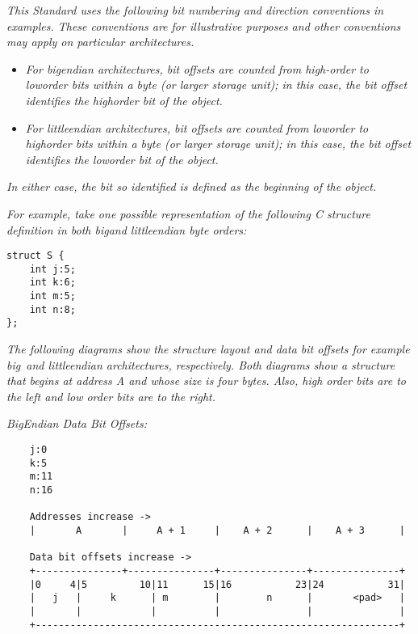 \textit{This Standard uses the following bit numbering and direction
conventions in examples. These conventions are for illustrative
purposes and other conventions may apply on particular
architectures.}


\begin{itemize}
\item \textit{For big\dash endian architectures, bit offsets are
counted from high-order to low\dash order bits within a byte (or
larger storage unit); in this case, the bit offset identifies
the high\dash order bit of the object.}

\item \textit{For little\dash endian architectures, bit offsets are
counted from low\dash order to high\dash order bits within a byte (or
larger storage unit); in this case, the bit offset identifies
the low\dash order bit of the object.}
\end{itemize}


\textit{In either case, the bit so identified is defined as the beginning of the object.}

\textit{For example, take one possible representation of the following C structure definition in both big\dash and little\dash endian byte orders:}

\begin{lstlisting}
struct S {
    int j:5;
    int k:6;
    int m:5;
    int n:8;
};
\end{lstlisting}

\textit{The following diagrams show the structure layout
and data bit offsets for example big\dash\   and little\dash endian
architectures, respectively. Both diagrams show a structure
that begins at address A and whose size is four bytes. Also,
high order bits are to the left and low order bits are to
the right.}

\textit{Big\dash Endian Data Bit Offsets:}

\begin{verbatim}
    j:0
    k:5
    m:11
    n:16

    Addresses increase ->
    |       A       |     A + 1     |    A + 2      |    A + 3      | 

    Data bit offsets increase ->
    +---------------+---------------+---------------+---------------+
    |0     4|5         10|11      15|16           23|24           31|
    |   j   |     k      | m        |        n      |       <pad>   |
    |       |            |          |               |               | 
    +---------------------------------------------------------------+ 
\end{verbatim}

